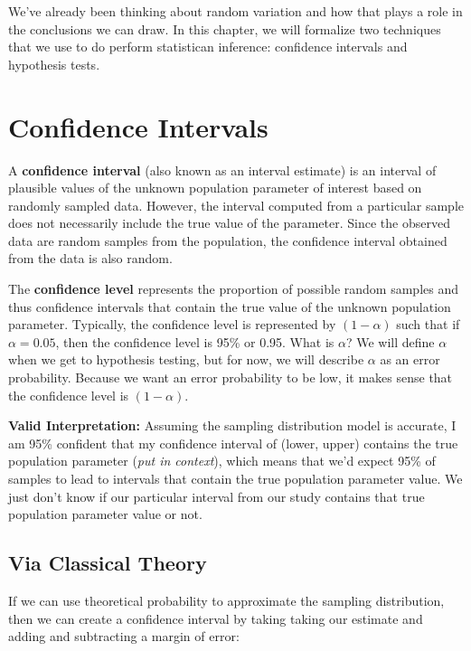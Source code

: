 \documentclass[
]{book}
\begin{document}
We've already been thinking about random variation and how that plays a role in the conclusions we can draw. In this chapter, we will formalize two techniques that we use to do perform statistican inference: confidence intervals and hypothesis tests.

\hypertarget{confidence-intervals}{%
\section{Confidence Intervals}\label{confidence-intervals}}

A \textbf{confidence interval} (also known as an interval estimate) is an interval of plausible values of the unknown population parameter of interest based on randomly sampled data. However, the interval computed from a particular sample does not necessarily include the true value of the parameter. Since the observed data are random samples from the population, the confidence interval obtained from the data is also random.

The \textbf{confidence level} represents the proportion of possible random samples and thus confidence intervals that contain the true value of the unknown population parameter. Typically, the confidence level is represented by \((1-\alpha)\) such that if \(\alpha = 0.05\), then the confidence level is 95\% or 0.95. What is \(\alpha\)? We will define \(\alpha\) when we get to hypothesis testing, but for now, we will describe \(\alpha\) as an error probability. Because we want an error probability to be low, it makes sense that the confidence level is \((1-\alpha)\).

\textbf{Valid Interpretation:} Assuming the sampling distribution model is accurate, I am 95\% confident that my confidence interval of (lower, upper) contains the true population parameter (\emph{put in context}), which means that we'd expect 95\% of samples to lead to intervals that contain the true population parameter value. We just don't know if our particular interval from our study contains that true population parameter value or not.

\hypertarget{via-classical-theory}{%
\subsection{Via Classical Theory}\label{via-classical-theory}}

If we can use theoretical probability to approximate the sampling distribution, then we can create a confidence interval by taking taking our estimate and adding and subtracting a margin of error:
\end{document}
